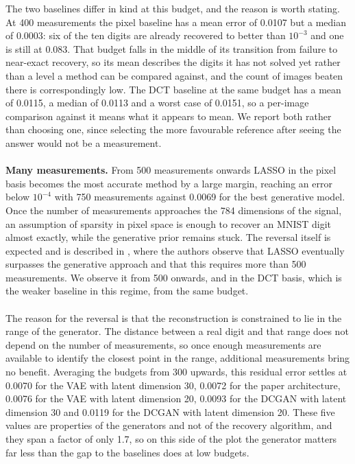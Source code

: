 The two baselines differ in kind at this budget, and the reason is worth stating. At 400 measurements the pixel baseline has a mean error of 0.0107 but a median of 0.0003: six of the ten digits are already recovered to better than \( 10^{-3} \) and one is still at 0.083. That budget falls in the middle of its transition from failure to near-exact recovery, so its mean describes the digits it has not solved yet rather than a level a method can be compared against, and the count of images beaten there is correspondingly low. The DCT baseline at the same budget has a mean of 0.0115, a median of 0.0113 and a worst case of 0.0151, so a per-image comparison against it means what it appears to mean. We report both rather than choosing one, since selecting the more favourable reference after seeing the answer would not be a measurement.
\\\\
\textbf{Many measurements.} From 500 measurements onwards LASSO in the pixel basis becomes the most accurate method by a large margin, reaching an error below \( 10^{-4} \) with 750 measurements against 0.0069 for the best generative model. Once the number of measurements approaches the 784 dimensions of the signal, an assumption of sparsity in pixel space is enough to recover an MNIST digit almost exactly, while the generative prior remains stuck. The reversal itself is expected and is described in \cite{bora2017}, where the authors observe that LASSO eventually surpasses the generative approach and that this requires more than 500 measurements. We observe it from 500 onwards, and in the DCT basis, which is the weaker baseline in this regime, from the same budget.
\\\\
The reason for the reversal is that the reconstruction is constrained to lie in the range of the generator. The distance between a real digit and that range does not depend on the number of measurements, so once enough measurements are available to identify the closest point in the range, additional measurements bring no benefit. Averaging the budgets from 300 upwards, this residual error settles at 0.0070 for the VAE with latent dimension 30, 0.0072 for the paper architecture, 0.0076 for the VAE with latent dimension 20, 0.0093 for the DCGAN with latent dimension 30 and 0.0119 for the DCGAN with latent dimension 20. These five values are properties of the generators and not of the recovery algorithm, and they span a factor of only 1.7, so on this side of the plot the generator matters far less than the gap to the baselines does at low budgets.

